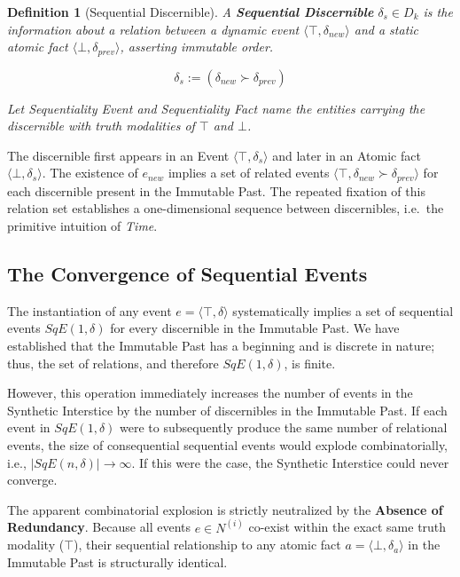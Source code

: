 \documentclass[11pt, a4paper]{article}
\theoremstyle{formalism}
\newtheorem{formalism}{Definition}
\begin{document}
\begin{formalism}[Sequential Discernible]

    A \textbf{Sequential Discernible} $\delta_s \in D_k$ is the information
    about a relation between a dynamic event $\langle \top, \delta_{new}
    \rangle$ and a static atomic fact $\langle \bot, \delta_{prev} \rangle$,
    asserting immutable order.
    
    \begin{equation}
        \delta_s := (\delta_{new} \succ \delta_{prev}) 
    \end{equation}

	Let {\it Sequentiality Event\/} and {\it Sequentiality Fact\/} name the
    entities carrying the discernible with truth modalities of $\top$ and $\bot$.

\end{formalism}

The discernible first appears in an Event $\langle \top, \delta_s \rangle$ and
later in an Atomic fact $\langle \bot, \delta_s \rangle$. The existence of
$e_{new}$ implies a set of related events $\langle \top, \delta_{new} \succ
\delta_{prev}\rangle$ for each discernible present in the Immutable Past. The
repeated fixation of this relation set establishes a one-dimensional sequence
between discernibles, i.e.\ the primitive intuition of \textit{Time}.

\subsection{The Convergence of Sequential Events}

The instantiation of any event $e = \langle \top, \delta \rangle$
systematically implies a set of sequential events $SqE(1, \delta)$ for every
discernible in the Immutable Past. We have established that the Immutable 
Past has a beginning and is discrete in nature; thus, the set of relations, 
and therefore $SqE(1, \delta)$, is finite. 

However, this operation immediately increases the number of events in the 
Synthetic Interstice by the number of discernibles in the Immutable Past. 
If each event in $SqE(1, \delta)$ were to subsequently produce the same number 
of relational events, the size of consequential sequential events would explode 
combinatorially, i.e., $| SqE(n, \delta) | \rightarrow \infty$. If this were 
the case, the Synthetic Interstice could never converge.

The apparent combinatorial explosion is strictly neutralized by the 
\textbf{Absence of Redundancy}. Because all events $e \in N^{(i)}$ co-exist 
within the exact same truth modality ($\top$), their sequential relationship 
to any atomic fact $a = \langle \bot, \delta_a \rangle$ in the Immutable Past 
is structurally identical. 
\end{document}
